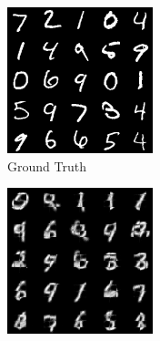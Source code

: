 \begin{figure}[H]
    \centering
    \begin{subfigure}[b]{0.24\textwidth}
        \centering
        \includegraphics[width=\textwidth]{figures/einsum/mnist/[]_ground_truth.png}
        \caption{Ground Truth}
    \end{subfigure}
    \begin{subfigure}[b]{0.24\textwidth}
        \centering
        \includegraphics[width=\textwidth]{figures/einsum/mnist/[]_EM.png}

\end{subfigure}
\end{figure}
